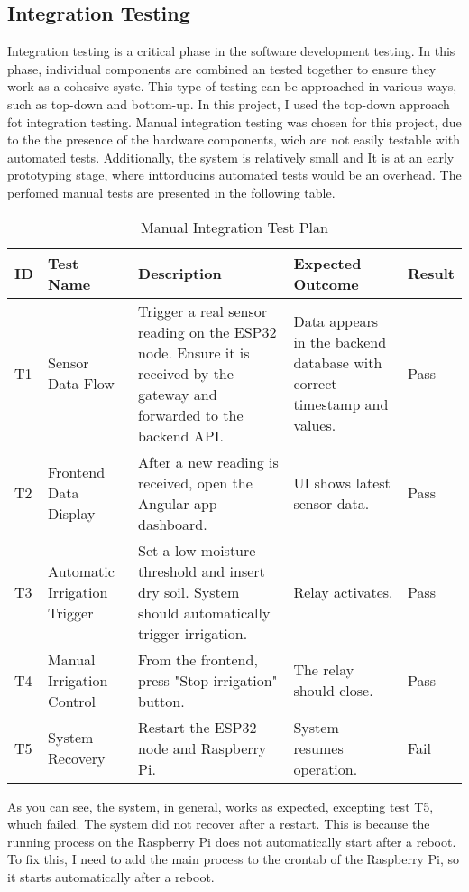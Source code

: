 \subsection {Integration Testing}
Integration testing is a critical phase in the software development testing. In this phase, individual components are combined an tested 
together to ensure they work as a cohesive syste. This type of testing can be approached in various ways, such as top-down and bottom-up.
In this project, I used the top-down approach fot integration testing. Manual integration testing was chosen for this project, due to the 
the presence of the hardware components, wich are not easily testable with automated tests. Additionally, the system is relatively small and It
is at an early prototyping stage, where inttorducins automated tests would be an overhead.
The perfomed manual tests are presented in the following table.
\begin{table}[H]
\centering
\begin{tabular}{|p{1cm}|p{4cm}|p{6cm}|p{3cm}|p{2cm}|}
\hline
\textbf{ID} & \textbf{Test Name} & \textbf{Description} & \textbf{Expected Outcome} & \textbf{Result} \\
\hline
T1 & Sensor Data Flow & Trigger a real sensor reading on the ESP32 node. Ensure it is received by the gateway and forwarded to the backend API. & Data appears in the backend database with correct timestamp and values. & Pass \\
\hline
T2 & Frontend Data Display & After a new reading is received, open the Angular app dashboard. & UI shows latest sensor data. & Pass \\
\hline
T3 & Automatic Irrigation Trigger & Set a low moisture threshold and insert dry soil. System should automatically trigger irrigation. & Relay activates. & Pass \\
\hline
T4 & Manual Irrigation Control & From the frontend, press "Stop irrigation" button. & The relay should close. & Pass \\
\hline
T5 & System Recovery & Restart the ESP32 node and Raspberry Pi. & System resumes operation. & Fail \\
\hline
\end{tabular}
\caption{Manual Integration Test Plan}
\label{tab:manual_integration_test_plan}
\end{table}

As you can see, the system, in general, works as expected, excepting test T5, whuch failed. The system did not recover after a restart.
This is because the running process on the Raspberry Pi does not automatically start after a reboot. To fix this,
I need to add the main process to the crontab of the Raspberry Pi, so it starts automatically after a reboot.

